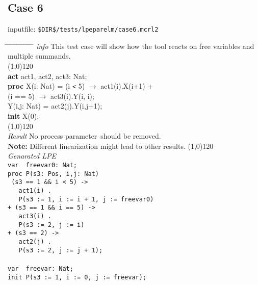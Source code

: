 \documentclass[a4paper,10pt]{article}
\theoremstyle{plain}
\theoremstyle{definition}
\newcommand{\ti}{\textit}
\newcommand{\tb}{\textbf}
\newcommand{\pp}{process parameter}
\newcommand{\tabw}{\hspace*{15.mm} \= \hspace*{20.mm} \= \hspace*{5.mm} \= \hspace*{5.mm} \= \hspace*{5.mm} \= \hspace*{5.mm}  \= \hspace*{5.mm}  \= \hspace*{5.mm}  \= \hspace*{5.mm} \= \hspace*{5.mm} \= \hspace*{5.mm}  \= \hspace*{5.mm}  \= \hspace*{5.mm}\kill}
\begin{document}
\subsection*{Case 6}
inputfile: \verb"$DIR$/tests/lpeparelm/case6.mcrl2"
\begin{tabbing}
\tabw
\ti{info} \> This test case will show how the tool reacts on free variables and multiple summands.\\
\line(1,0){120}\\
\tb{act} \> act1, act2, act3: Nat; \\
\tb{proc} \> X(i: Nat) \>  = \> (i \verb"<" 5) $\rightarrow$ act1(i).X(i+1) + \\
\> \> \>     (i == 5) $\rightarrow$ act3(i).Y(i, i); \\
\>     Y(i,j: Nat) \> = \> act2(j).Y(i,j+1); \\
\tb{init} X(0); \\
\line(1,0){120}\\
\ti{Result} \> No \pp\ should be removed.\\ 
\> \textbf{Note:} Different linearization might lead to other results.
\line(1,0){120}\\
\ti{Genarated LPE} \\
\>  \verb"var  freevar0: Nat;"\\
\>  \verb"proc P(s3: Pos, i,j: Nat)"\\
\>  \verb" (s3 == 1 && i < 5) ->"\\
\>  \verb"   act1(i) ."\\
\>  \verb"   P(s3 := 1, i := i + 1, j := freevar0)"\\
\>  \verb"+ (s3 == 1 && i == 5) ->"\\
\>  \verb"   act3(i) ."\\
\>  \verb"   P(s3 := 2, j := i)"\\
\>  \verb"+ (s3 == 2) ->"\\
\>  \verb"   act2(j) ."\\
\>  \verb"   P(s3 := 2, j := j + 1);"\\
\\
\>  \verb"var  freevar: Nat;"\\
\>  \verb"init P(s3 := 1, i := 0, j := freevar);"\\
\end{tabbing}
\end{document}
